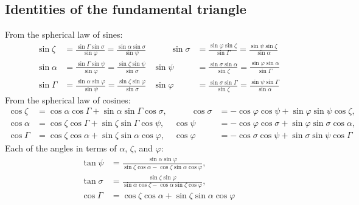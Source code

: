 \documentclass{book}
\newcommand{\phase}{\varphi}
\begin{document}
\subsection{Identities of the fundamental triangle}

From the spherical law of sines:
\begin{equation}
    \begin{aligned}
    \sin\zeta  &= \frac{\sin\Gamma \sin\sigma}{\sin\phase}
                = \frac{\sin\alpha \sin\sigma}{\sin\psi} &\qquad
    \sin\sigma &= \frac{\sin\phase \sin\zeta}{\sin\Gamma}
                = \frac{\sin\psi \sin\zeta}{\sin\alpha} \\
    \sin\alpha &= \frac{\sin\Gamma \sin\psi}{\sin\phase}
                = \frac{\sin\zeta \sin\psi}{\sin\sigma} &
    \sin\psi   &= \frac{\sin\sigma\sin\alpha}{\sin\zeta}
                = \frac{\sin\phase \sin\alpha}{\sin\Gamma} \\
    \sin\Gamma &= \frac{\sin\alpha \sin\phase}{\sin\psi}
                = \frac{\sin\zeta \sin\phase}{\sin\sigma} &
    \sin\phase &= \frac{\sin\sigma \sin\Gamma}{\sin\zeta}
                = \frac{\sin\psi \sin\Gamma}{\sin\alpha}
    \end{aligned}
\end{equation}
From the spherical law of cosines:
\begin{equation}
    \begin{aligned}
        \cos\zeta  &=  \cos\alpha \cos\Gamma + \sin\alpha \sin\Gamma \cos\sigma, &\qquad
        \cos\sigma &= -\cos\phase \cos\psi   + \sin\phase \sin\psi   \cos\zeta,  \\[5pt]
        \cos\alpha &=  \cos\zeta  \cos\Gamma + \sin\zeta  \sin\Gamma \cos\psi,   &
        \cos\psi   &= -\cos\phase \cos\sigma + \sin\phase \sin\sigma \cos\alpha, \\[5pt]
        \cos\Gamma &=  \cos\zeta  \cos\alpha + \sin\zeta  \sin\alpha \cos\phase, &
        \cos\phase &= -\cos\sigma \cos\psi   + \sin\sigma \sin\psi   \cos\Gamma
    \end{aligned}
\end{equation}
Each of the angles in terms of $\alpha$, $\zeta$, and $\phase$:
\begin{equation}
    \begin{aligned}
        \tan\psi   &= \frac{\sin\alpha \sin\phase}{\sin\zeta \cos\alpha - \cos\zeta \sin\alpha \cos\phase}, \\[5pt]
        \tan\sigma &= \frac{\sin\zeta  \sin\phase}{\sin\alpha \cos\zeta - \cos\alpha \sin\zeta \cos\phase}, \\[10pt]
        \cos\Gamma &= \cos\zeta  \cos\alpha + \sin\zeta  \sin\alpha \cos\phase
    \end{aligned}
\end{equation}
\end{document}
